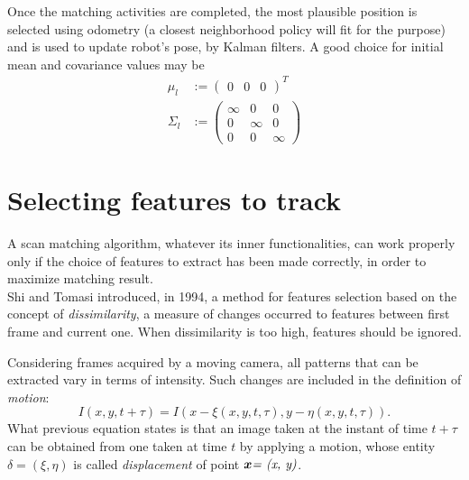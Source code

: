 \documentclass[a4paper, onecolumn]{report}
\begin{document}
Once the matching activities are completed, the most plausible position is selected using odometry (a closest neighborhood policy will fit for the purpose) and is used to update robot's pose, by Kalman filters. A good choice for initial mean and covariance values may be 
\begin{equation}
	\begin{aligned}
		\mu_l &:= \left(\begin{matrix}0 & 0 & 0\end{matrix}\right)^T \\
		\Sigma_l &:= \left(\begin{matrix} \infty & 0 & 0 \\ 0 & \infty & 0 \\ 0 & 0 & \infty\end{matrix}\right)
	\end{aligned}
\end{equation}

\section{Selecting features to track}
A scan matching algorithm, whatever its inner functionalities, can work properly only if the choice of features to extract has been made correctly, in order to maximize matching result. \\
Shi and Tomasi introduced, in 1994, a method for features selection based on the concept of \emph{dissimilarity}, a measure of changes occurred to features between first frame and current one. When dissimilarity is too high, features should be ignored. 

Considering frames acquired by a moving camera, all patterns that can be extracted vary in terms of intensity. Such changes are included in the definition of \emph{motion}:
\begin{equation}
	I(x, y, t+\tau) = I(x-\xi(x,y,t,\tau), y - \eta(x,y,t,\tau)).
\end{equation}
What previous equation states is that an image taken at the instant of time $t+\tau$ can be obtained from one taken at time $t$ by applying a motion, whose entity $\delta = (\xi, \eta)$ is called \emph{displacement} of point $\boldsymbol{x}\emph{= (x, y)}$.
\end{document}
